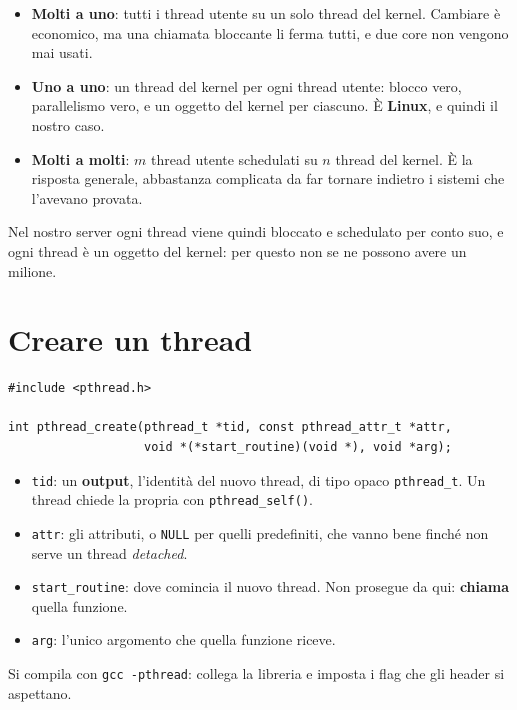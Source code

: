 \begin{itemize}
    \item \textbf{Molti a uno}: tutti i thread utente su un solo thread del kernel. Cambiare è economico, ma una chiamata
          bloccante li ferma tutti, e due core non vengono mai usati.
    \item \textbf{Uno a uno}: un thread del kernel per ogni thread utente: blocco vero, parallelismo vero, e un oggetto del
          kernel per ciascuno. È \textbf{Linux}, e quindi il nostro caso.
    \item \textbf{Molti a molti}: $m$ thread utente schedulati su $n$ thread del kernel. È la risposta generale, abbastanza
          complicata da far tornare indietro i sistemi che l'avevano provata.
\end{itemize}
Nel nostro server ogni thread viene quindi bloccato e schedulato per conto suo, e ogni thread è un oggetto del kernel: per
questo non se ne possono avere un milione.

\section{Creare un thread}

\begin{lstlisting}[language={[POSIX]C}]
#include <pthread.h>

int pthread_create(pthread_t *tid, const pthread_attr_t *attr,
                   void *(*start_routine)(void *), void *arg);
\end{lstlisting}

\begin{itemize}
    \item \texttt{tid}: un \textbf{output}, l'identità del nuovo thread, di tipo opaco \texttt{pthread\_t}. Un thread chiede
          la propria con \texttt{pthread\_self()}.
    \item \texttt{attr}: gli attributi, o \texttt{NULL} per quelli predefiniti, che vanno bene finché non serve un thread
          \emph{detached}.
    \item \texttt{start\_routine}: dove comincia il nuovo thread. Non prosegue da qui: \textbf{chiama} quella funzione.
    \item \texttt{arg}: l'unico argomento che quella funzione riceve.
\end{itemize}
Si compila con \texttt{gcc -pthread}: collega la libreria e imposta i flag che gli header si aspettano.

